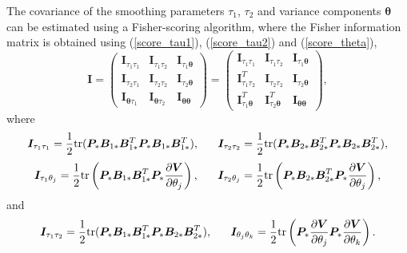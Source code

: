 \documentclass[review]{elsarticle}
\begin{document}
The covariance of the  smoothing parameters $\tau_1$, $\tau_2$ 
and variance components $\boldsymbol \theta$ can be estimated using a Fisher-scoring algorithm, where the Fisher information matrix is obtained using (\ref{score_tau1}), (\ref{score_tau2}) and (\ref{score_theta}), 
$$
\boldsymbol I  = 
 \begin{pmatrix}
  \boldsymbol I _{\tau_1\tau_1} & \boldsymbol I_{\tau_1  \tau_2} & \boldsymbol I_{\tau_1  \boldsymbol\theta} \\
  \boldsymbol I_{\tau_2  \tau_1} & \boldsymbol I_{\tau_2  \tau_2}  & \boldsymbol I_{\tau_2  \boldsymbol\theta} \\
  \boldsymbol I_{\boldsymbol\theta \tau_1} & \boldsymbol I_{ \boldsymbol\theta \tau_2}  & \boldsymbol I_{\boldsymbol\theta  \boldsymbol\theta} 
 \end{pmatrix}
  = 
 \begin{pmatrix}
  \boldsymbol I _{\tau_1\tau_1} & \boldsymbol I_{\tau_1  \tau_2} & \boldsymbol I_{\tau_1  \boldsymbol\theta} \\
 \boldsymbol I_{\tau_1  \tau_2}^T & \boldsymbol I_{\tau_2  \tau_2}  & \boldsymbol I_{\tau_2  \boldsymbol\theta} \\
\boldsymbol I_{\tau_1  \boldsymbol\theta}^T & \boldsymbol I_{\tau_2  \boldsymbol\theta}^T  & \boldsymbol I_{\boldsymbol\theta  \boldsymbol\theta} 
 \end{pmatrix},
$$
where 
$$
\boldsymbol I _{\tau_1\tau_1}  
=
 {1 \over 2}
{\rm tr} (\boldsymbol P_*  \boldsymbol B_{1*} \boldsymbol B_{1*}^T \boldsymbol P_*
 \boldsymbol B_{1*} \boldsymbol B_{1*}^T), 
\quad \ \ 
\boldsymbol I _{\tau_2\tau_2}  
=
 {1 \over 2}
{\rm tr}  (\boldsymbol P_*  \boldsymbol B_{2*} \boldsymbol B_{2*}^T \boldsymbol P_*
 \boldsymbol B_{2*} \boldsymbol B_{2*}^T),
$$
$$
\boldsymbol I _{\tau_1 \theta_j}  
=
{1 \over 2}
{\rm tr} \left(\boldsymbol P_*  \boldsymbol B_{1*} \boldsymbol B_{1*}^T \boldsymbol P_*
{\partial \boldsymbol V  \over \partial \theta_j}\right), 
\quad \ \ 
\boldsymbol I _{\tau_2 \theta_j}  
=
 {1 \over 2}
{\rm tr} \left(\boldsymbol P_*  \boldsymbol B_{2*} \boldsymbol B_{2*}^T \boldsymbol P_*
{\partial \boldsymbol V  \over \partial \theta_j}\right), 
$$
and 
$$
\boldsymbol I _{\tau_1\tau_2}  
=
{1 \over 2}
{\rm tr} (\boldsymbol P_* \boldsymbol B_{1*} \boldsymbol B_{1*}^T
\boldsymbol P_* \boldsymbol B_{2*} \boldsymbol B_{2*}^T), 
\quad \ \ 
\boldsymbol I _{\theta_j \theta_k}  
=
{1 \over 2}
{\rm tr} \left(
\boldsymbol P_* {\partial \boldsymbol V \over \partial \theta_j} \boldsymbol P_*
{\partial \boldsymbol V  \over \partial \theta_k}
\right).
$$
\end{document}
